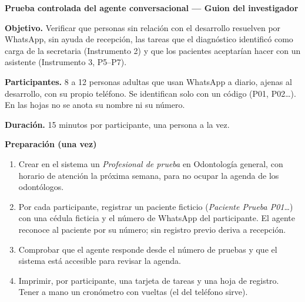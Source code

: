 \documentclass[11pt,a4paper]{article}
\newcommand{\titulo}[1]{\begin{center}\large\bfseries #1\end{center}\vspace{-4pt}}
\begin{document}
\titulo{Prueba controlada del agente conversacional — Guion del investigador}

\textbf{Objetivo.} Verificar que personas sin relación con el desarrollo resuelven por WhatsApp, sin ayuda de recepción, las tareas que el diagnóstico identificó como carga de la secretaria (Instrumento 2) y que los pacientes aceptarían hacer con un asistente (Instrumento 3, P5--P7).

\textbf{Participantes.} 8 a 12 personas adultas que usan WhatsApp a diario, ajenas al desarrollo, con su propio teléfono. Se identifican solo con un código (P01, P02…). En las hojas no se anota su nombre ni su número.

\textbf{Duración.} 15 minutos por participante, una persona a la vez.

\textbf{Preparación (una vez)}
\begin{enumerate}[nosep,leftmargin=*]
  \item Crear en el sistema un \emph{Profesional de prueba} en Odontología general, con horario de atención la próxima semana, para no ocupar la agenda de los odontólogos.
  \item Por cada participante, registrar un paciente ficticio (\emph{Paciente Prueba P01}…) con una cédula ficticia y el número de WhatsApp del participante. El agente reconoce al paciente por su número; sin registro previo deriva a recepción.
  \item Comprobar que el agente responde desde el número de pruebas y que el sistema está accesible para revisar la agenda.
  \item Imprimir, por participante, una tarjeta de tareas y una hoja de registro. Tener a mano un cronómetro con vueltas (el del teléfono sirve).
\end{enumerate}
\end{document}
